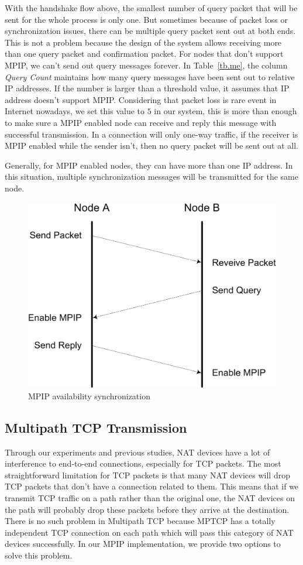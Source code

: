 With the handshake flow above, the smallest number of query packet that will be sent for the whole process is only one. But sometimes because of packet loss or synchronization issues, there can be multiple query packet sent out at both ends. This is not a problem because the design of the system allows receiving more than one query packet and confirmation packet. For nodes that don't support MPIP, we can't send out query messages forever. In Table~\ref{tb.me}, the column \emph{Query Count} maintains how many query messages have been sent out to relative IP addresses. If the number is larger than a threshold value, it assumes that IP address doesn't support MPIP. Considering that packet loss is rare event in Internet nowadays, we set this value to $5$ in our system, this is more than enough to make sure a MPIP enabled node can receive and reply this message with successful transmission. In a connection will only one-way traffic, if the receiver is MPIP enabled while the sender isn't, then no query packet will be sent out at all.

Generally, for MPIP enabled nodes, they can have more than one IP address. In this situation, multiple synchronization messages will be transmitted for the same node.

\begin{figure}
\centering
\includegraphics[width=0.8\linewidth]{fig/me.eps}
\caption{MPIP availability synchronization}
\label{fig.me}
\end{figure}

\subsection{Multipath TCP Transmission}
Through our experiments and previous studies\cite{mptcp}, NAT devices have a lot of interference to end-to-end connections, especially for TCP packets. The most straightforward limitation for TCP packets is that many NAT devices will drop TCP packets that don't have a connection related to them. This means that if we transmit TCP traffic on a path rather than the original one, the NAT devices on the path will probably drop these packets before they arrive at the destination. There is no such problem in Multipath TCP\cite{mptcp} because MPTCP has a totally independent TCP connection on each path which will pass this category of NAT devices successfully. In our MPIP implementation, we provide two options to solve this problem.

